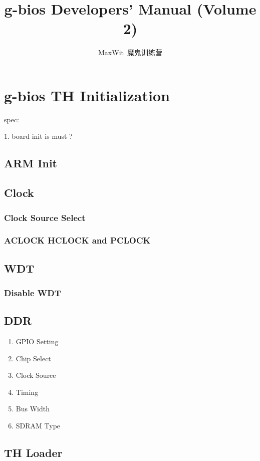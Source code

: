 \documentclass[a4paper,11pt]{book}
\title{g-bios Developers' Manual (Volume 2)}
\author{MaxWit~魔鬼训练营}
\begin{document}
\maketitle
\tableofcontents

\chapter{g-bios TH Initialization}

spec:

1. board init is must ?

\section{ARM Init}

\section{Clock}
\subsection{Clock Source Select}
\subsection{ACLOCK HCLOCK and PCLOCK}

\section{WDT}
\subsection{Disable WDT}

\section{DDR}
\begin{enumerate}
\item GPIO Setting
\item Chip Select
\item Clock Source
\item Timing
\item Bus Width
\item SDRAM Type
\end{enumerate}

\section{TH Loader}
\end{document}
